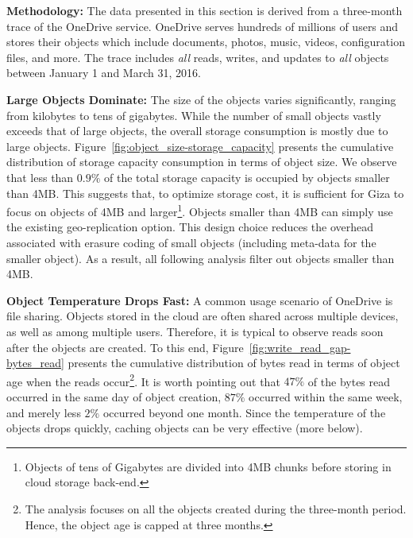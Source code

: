 
{\bf Methodology:} The data presented in this section is derived from a three-month trace of the OneDrive service. OneDrive serves hundreds of millions of users and stores their objects which include documents, photos, music, videos, configuration files, and more. The trace includes {\em all} reads, writes, and updates to {\em all} objects between January 1 and March 31, 2016.

{\bf Large Objects Dominate:} The size of the objects varies significantly, ranging from kilobytes to tens of gigabytes. While the number of small objects vastly exceeds that of large objects, the overall storage consumption is mostly due to large objects. Figure~\ref{fig:object_size-storage_capacity} presents the cumulative distribution of storage capacity consumption in terms of object size. We observe that less than $0.9\%$ of the total storage capacity is occupied by objects smaller than 4MB. This suggests that, to optimize storage cost, it is sufficient for Giza to focus on objects of 4MB and larger\footnote{Objects of tens of Gigabytes are divided into 4MB chunks before storing in cloud storage back-end.}. Objects smaller than 4MB can simply use the existing geo-replication option. This design choice reduces the overhead associated with erasure coding of small objects (including meta-data for the smaller object). As a result, all following analysis filter out objects smaller than 4MB.

{\bf Object Temperature Drops Fast:} A common usage scenario of OneDrive is file sharing. Objects stored in the cloud are often shared across multiple devices, as well as among multiple users. Therefore, it is typical to observe reads soon after the objects are created. To this end, Figure~\ref{fig:write_read_gap-bytes_read} presents the cumulative distribution of bytes read in terms of object age when the reads occur\footnote{The analysis focuses on all the objects created during the three-month period. Hence, the object age is capped at three months.}. It is worth pointing out that $47\%$ of the bytes read occurred in the same day of object creation, $87\%$ occurred within the same week, and merely less $2\%$ occurred beyond one month. Since the temperature of the objects drops quickly, caching objects can be very effective (more below). 

